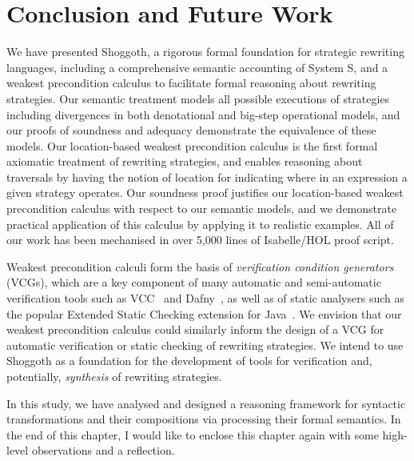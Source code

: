 \section{Conclusion and Future Work}
\label{chap4:conclusion-future-work}
We have presented Shoggoth, a rigorous formal foundation for strategic rewriting languages, including a comprehensive semantic accounting of System S, and a weakest precondition calculus to facilitate formal reasoning about rewriting strategies. Our semantic treatment models all possible executions of strategies including divergences in both denotational and big-step operational models, and our proofs of soundness and adequacy demonstrate the equivalence of these models. Our location-based weakest precondition calculus is the first formal axiomatic treatment of rewriting strategies, and enables reasoning about traversals by having the notion of location for indicating where in an expression a given strategy operates. Our soundness proof justifies our location-based weakest precondition calculus with respect to our semantic models, and we demonstrate practical application of this calculus by applying it to realistic examples. All of our work has been mechanised in over 5,000 lines of Isabelle/HOL proof script.

Weakest precondition calculi form the basis of \emph{verification condition generators} (VCGs), which are a key component of many automatic and semi-automatic verification tools such as VCC~\citep{DBLP:conf/tphol/CohenDHLMSST09} and Dafny~\citep{DBLP:conf/lpar/Leino10}, as well as of static analysers such as the popular Extended Static Checking extension for Java~\citep{DBLP:conf/pldi/FlanaganLLNSS02, DBLP:journals/ipl/Leino05}. We envision that our weakest precondition calculus could similarly inform the design of a VCG for automatic verification or static checking of rewriting strategies. We intend to use Shoggoth as a foundation for the development of tools for verification and, potentially, \emph{synthesis} of rewriting strategies.

\noindent
\begin{center}
\vspace{0.3em}
\vspace{-0.7em}
\end{center}
In this study, we have analysed and designed a reasoning framework for syntactic transformations and their compositions via processing their formal semantics. In the end of this chapter, I would like to enclose this chapter again with some high-level observations and a reflection.

